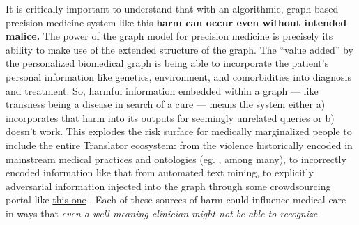 It is critically important to understand that with an algorithmic,
graph-based precision medicine system like this \textbf{harm can occur
even without intended malice.} The power of the graph model for
precision medicine is precisely its ability to make use of the extended
structure of the graph. The ``value added'' by
the personalized biomedical graph is being able to incorporate the
patient's personal information like genetics, environment, and
comorbidities into diagnosis and treatment. So, harmful information
embedded within a graph --- like transness being a disease in search of
a cure --- means the system either a) incorporates that harm into its
outputs for seemingly unrelated queries or b) doesn't work. This
explodes the risk surface for medically marginalized people to include
the entire Translator ecosystem: from the violence historically encoded
in mainstream medical practices and ontologies (eg. \cite{ramTransphobiaEncodedExamination2021, ashleyMisuseGenderDysphoria2019} , among many), to incorrectly encoded information like that from
automated text mining, to explicitly adversarial information injected
into the graph through some crowdsourcing portal like
\href{https://collaboratory.semanticscience.org/}{this one} \cite{masstrichtu-idsKnowledgeCollaboratory2022} . Each of these sources of
harm could influence medical care in ways that \emph{even a well-meaning
clinician might not be able to recognize.}


